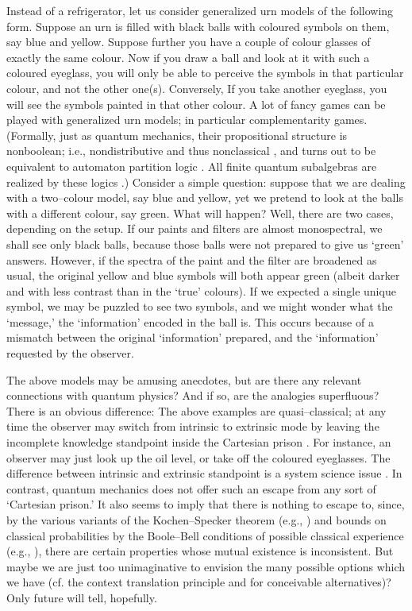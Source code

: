 \documentclass{article}
\begin{document}
Instead of a refrigerator,
let us consider generalized urn models \cite{wright:pent,wright,svozil-2001-eua}
of the following form.
Suppose an urn is filled with black balls with coloured symbols on them, say blue and yellow.
Suppose further you have a couple of colour glasses of exactly the same colour.
Now if you draw a ball and look at it with such a coloured eyeglass,
you will only be able to perceive the symbols
in that particular colour, and not the other one(s). Conversely,
If you take another eyeglass,
you will see the symbols painted in that other colour.
A lot of fancy games can be played with generalized urn models; in particular complementarity games.
(Formally,
just as quantum mechanics,
their propositional structure is nonboolean;
i.e., nondistributive and thus nonclassical \cite{svozil-ql},
and turns out to be equivalent to automaton partition logic \cite{svozil-2001-eua}.
All finite quantum subalgebras are realized by these logics \cite[Section 3.5.3]{svozil-ql}.)
Consider a simple question: suppose that we are dealing with a two--colour model,
say blue and yellow, yet we pretend to look at the balls with a different colour, say green.
What will happen? Well, there are two cases, depending on the setup.
If our paints and filters are almost monospectral, we shall see
only black balls, because those balls were not prepared to give us `green' answers.
However, if the spectra of the paint and the filter are broadened as usual,
the original yellow and blue symbols will both appear green
(albeit darker and with less contrast than in the `true' colours).
If we expected a single unique symbol, we may be puzzled to see two symbols,
and we might wonder what the `message,' the `information' encoded in the ball is.
This occurs because of a mismatch between the original `information' prepared,
and the `information' requested by the observer.


The above models may be amusing anecdotes,
but are there any relevant connections with quantum physics?
And if so, are the analogies superfluous?
There is an obvious difference: The above examples are quasi--classical;
at any time the observer may switch from intrinsic to extrinsic mode by leaving
the incomplete knowledge standpoint inside the Cartesian prison \cite[Sect. 1.9]{descartes-meditation}.
For instance, an observer may just look up the oil level, or take off the coloured eyeglasses.
The difference between intrinsic and extrinsic standpoint is a system science issue
\cite{svozil-93,svozil-unev}.
In contrast, quantum mechanics does not offer such an escape from any sort of `Cartesian prison.'
It also seems to imply that there is nothing to escape to,
since,
by the various variants of the Kochen--Specker theorem
(e.g., \cite{ZirlSchl-65,kochen1,svozil-ql})
and bounds on classical probabilities by the Boole--Bell conditions of possible classical experience
(e.g., \cite{bell-87,2000-poly}),
there are certain properties whose mutual existence is inconsistent.
But maybe we are just too unimaginative to envision the many possible options
which we have
(cf. the context translation principle and \cite{pitowsky-82,clifton:99} for conceivable alternatives)?
Only future will tell, hopefully.
\end{document}
